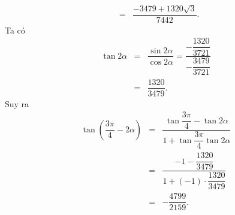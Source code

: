 \begin{ex}
{\begin{itemchoice}
\begin{eqnarray*}
				 &=&\dfrac{-3479+1320\sqrt{3}}{7442}.
			\end{eqnarray*}
			\itemch Ta  có
			\begin{eqnarray*}
				\tan 2\alpha&=&\dfrac{\sin  2\alpha}{\cos 2\alpha}=\dfrac{-\dfrac{1320}{3721}}{-\dfrac{3479}{3721}}\\
				 &=&\dfrac{1320}{3479}.
			\end{eqnarray*}
			 Suy ra
			\begin{eqnarray*}\tan \left(\dfrac{3\pi}{4}-2\alpha \right)&=&\dfrac{\tan \dfrac{3\pi}{4}-\tan 2\alpha}{1+\tan \dfrac{3\pi}{4} \tan 2\alpha}\\
				 &=&\dfrac{-1-\dfrac{1320}{3479}}{1+\left(-1\right)\cdot \dfrac{1320}{3479}}\\
				&=&-\dfrac{4799}{2159}. 
			\end{eqnarray*}
		\end{itemchoice}
	 }
\end{ex}

